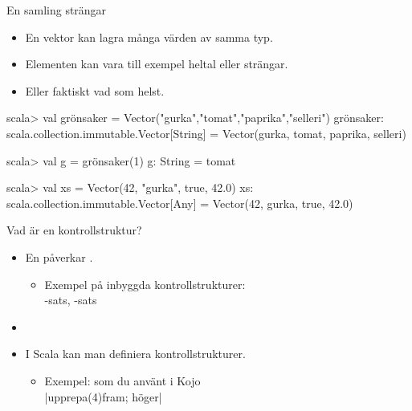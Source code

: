 \begin{Slide}{En samling strängar}

\begin{itemize}
\item En vektor kan lagra många värden av samma typ. 
\item Elementen kan vara till exempel heltal eller strängar. 
\item Eller faktiskt vad som helst. 
\end{itemize}

\begin{REPL}
scala> val grönsaker = Vector("gurka","tomat","paprika","selleri")
grönsaker: scala.collection.immutable.Vector[String] = Vector(gurka, tomat, paprika, selleri)

scala> val g = grönsaker(1)
g: String = tomat

scala> val xs = Vector(42, "gurka", true, 42.0)
xs: scala.collection.immutable.Vector[Any] = Vector(42, gurka, true, 42.0)


\end{REPL}

\end{Slide}

\begin{Slide}{Vad är en kontrollstruktur?}
\begin{itemize}
\item En  påverkar .
\begin{itemize}
\item[] Exempel på inbyggda kontrollstrukturer: 
\\\vspace{0.5em}-sats, -sats
\end{itemize}

\item[]

\item I Scala kan man definiera  kontrollstrukturer.
\begin{itemize}
\item[] Exempel:  som du använt i Kojo
\\\vspace{0.5em}\code|upprepa(4){fram; höger}|
\end{itemize}
\end{itemize}
\end{Slide}



